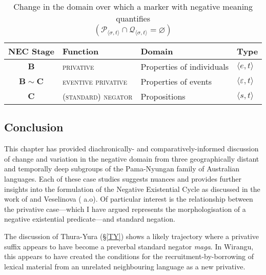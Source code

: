 \documentclass[usenames,dvipsnames,11pt]{article}
\begin{document}
{\begin{table}[h]\centering
	\caption{Change in the domain over which a marker with negative meaning quantifies\\$(\mathcal P_{\langle\sigma,t\rangle}\cap\mathcal Q_{\langle\sigma,t\rangle}=\varnothing )$}\label{domainGen}\centering
\begin{tabular}{clll}
\textbf{NEC Stage} &	\textbf{Function} & \textbf{Domain} & \textbf{Type}\\\midrule
$ \boldsymbol{B} $ &	\textsc{privative}	& Properties of individuals&$ \langle e,t\rangle $\\
 $ \boldsymbol{B\!\sim\!C} $&	\textsc{eventive privative}& Properties of events&$ \langle\varepsilon,t\rangle $ \\
 $ \boldsymbol{C} $ &	\textsc{(standard) negator}& Propositions & $ \langle s,t\rangle $\\\bottomrule
\end{tabular}
\end{table}
\iffalse
 \pex\a \begingl\gla...ga wiripuny mala bäyŋu (marŋgi-mirr ḻatjin-gu ḻuka-nhara-w)//
\glb and certain group \gls{negq} knowledge-\gls{prop} mangrove.worm-\gls{dat} eat-IV-\gls{dat}//
\glft`and other (Europeans) don't know about eating mangrove worms'\trailingcitation{\citep[adapted from ][414]{Wilkinson1991}}//\endgl
\a \fi


\subsection{Conclusion}

This chapter has provided diachronically- and comparatively-informed discussion of change and variation in the negative domain from three geographically distant and temporally deep subgroups of the Pama-Nyungan family of Australian languages. Each of these case studies suggests nuances and provides further insights into the formulation of the Negative Existential Cycle as discussed in the work of \citet{Croft1991} and Veselinova (\citeyear{Veselinova2016} a.o). Of particular interest is the relationship between the privative case---which I have argued represents the morphologisation of a negative existential predicate---and standard negation.

The discussion of Thura-Yura (§\ref{TY}) shows a likely trajectory where a privative suffix appears to have become a preverbal standard negator \textit{maga}. In Wirangu, this appears to have created the conditions for the recruitment-by-borrowing of lexical material from an unrelated neighbouring language as a new privative.

}
\end{document}
